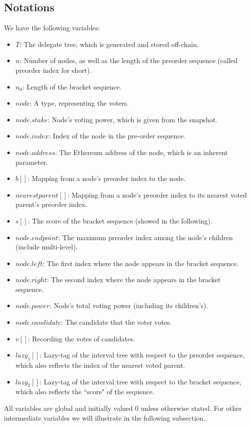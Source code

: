 \subsection{Notations}
We have the following variables:
\begin{itemize}
	\item $T$: The delegate tree, which is generated and stored off-chain. 
	\item $n$: Number of nodes, as well as the length of the preorder sequence (called preorder index for short). 
	\item $n_0$: Length of the bracket sequence. 
	\item $node$: A type, representing the voters. 
	\item $node.stake$: Node's voting power, which is given from the snapshot.
	\item $node.index$: Index of the node in the pre-order sequence.
	\item $node.address$: The Ethereum address of the node, which is an inherent  
	parameter.
	\item $b[]$: Mapping from a node's preorder index to the node.
	\item $nearestparent[]$: Mapping from a node's preorder index to its nearest voted parent's preorder index.
	\item $s[]$:  The score of the bracket sequence (showed in the following).
	\item $node.endpoint$: The maximum preorder index among the node's children (include multi-level).
	\item $node.left$: The first index where the node appears in the bracket sequence. 
	\item $node.right$: The second index where the node appears in the bracket sequence. 
	\item $node.power$: Node's total voting power (including its children's).
	\item $node.candidate$: The candidate that the voter votes.
	\item $v[]$: Recording the votes of candidates.
	\item $lazy_1[]$: Lazy-tag of the interval tree with respect to the preorder sequence, which also reflects the index of the nearest voted parent.
	\item $lazy_2[]$: Lazy-tag of the interval tree with respect to the bracket sequence, which also reflects the ``score" of the sequence.
\end{itemize}
All variables are global and initially valued 0 unless otherwise stated.  For other intermediate variables we will illustrate in the following subsection.
